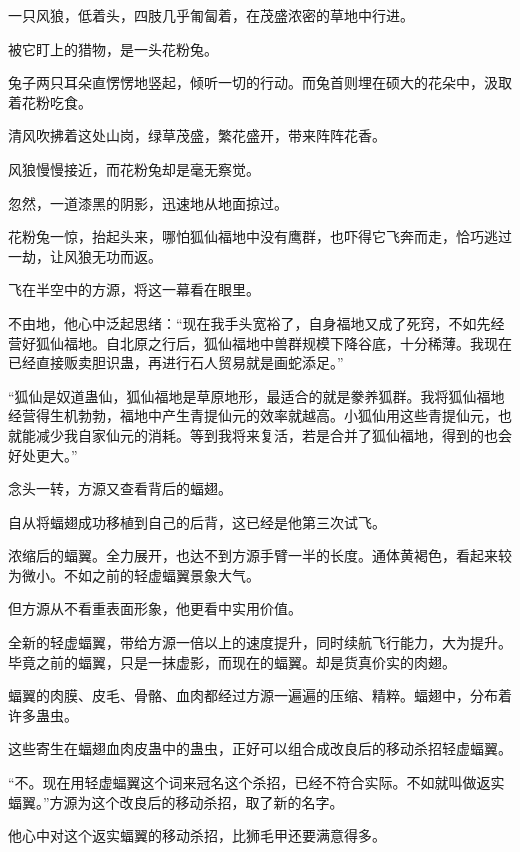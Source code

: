 
\begin{this_body}



一只风狼，低着头，四肢几乎匍匐着，在茂盛浓密的草地中行进。

被它盯上的猎物，是一头花粉兔。

兔子两只耳朵直愣愣地竖起，倾听一切的行动。而兔首则埋在硕大的花朵中，汲取着花粉吃食。

清风吹拂着这处山岗，绿草茂盛，繁花盛开，带来阵阵花香。

风狼慢慢接近，而花粉兔却是毫无察觉。

忽然，一道漆黑的阴影，迅速地从地面掠过。

花粉兔一惊，抬起头来，哪怕狐仙福地中没有鹰群，也吓得它飞奔而走，恰巧逃过一劫，让风狼无功而返。

飞在半空中的方源，将这一幕看在眼里。

不由地，他心中泛起思绪：“现在我手头宽裕了，自身福地又成了死窍，不如先经营好狐仙福地。自北原之行后，狐仙福地中兽群规模下降谷底，十分稀薄。我现在已经直接贩卖胆识蛊，再进行石人贸易就是画蛇添足。”

“狐仙是奴道蛊仙，狐仙福地是草原地形，最适合的就是豢养狐群。我将狐仙福地经营得生机勃勃，福地中产生青提仙元的效率就越高。小狐仙用这些青提仙元，也就能减少我自家仙元的消耗。等到我将来复活，若是合并了狐仙福地，得到的也会好处更大。”

念头一转，方源又查看背后的蝠翅。

自从将蝠翅成功移植到自己的后背，这已经是他第三次试飞。

浓缩后的蝠翼。全力展开，也达不到方源手臂一半的长度。通体黄褐色，看起来较为微小。不如之前的轻虚蝠翼景象大气。

但方源从不看重表面形象，他更看中实用价值。

全新的轻虚蝠翼，带给方源一倍以上的速度提升，同时续航飞行能力，大为提升。毕竟之前的蝠翼，只是一抹虚影，而现在的蝠翼。却是货真价实的肉翅。

蝠翼的肉膜、皮毛、骨骼、血肉都经过方源一遍遍的压缩、精粹。蝠翅中，分布着许多蛊虫。

这些寄生在蝠翅血肉皮蛊中的蛊虫，正好可以组合成改良后的移动杀招轻虚蝠翼。

“不。现在用轻虚蝠翼这个词来冠名这个杀招，已经不符合实际。不如就叫做返实蝠翼。”方源为这个改良后的移动杀招，取了新的名字。

他心中对这个返实蝠翼的移动杀招，比狮毛甲还要满意得多。


\end{this_body}
